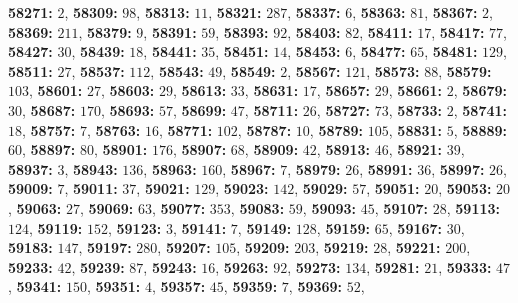 \textsf{\bfseries 58271:} $2$, \textsf{\bfseries 58309:} $98$, \textsf{\bfseries 58313:} $11$, \textsf{\bfseries 58321:} $287$, \textsf{\bfseries 58337:} $6$, \textsf{\bfseries 58363:} $81$, \textsf{\bfseries 58367:} $2$, \textsf{\bfseries 58369:} $211$, \textsf{\bfseries 58379:} $9$, \textsf{\bfseries 58391:} $59$, \textsf{\bfseries 58393:} $92$, \textsf{\bfseries 58403:} $82$, \textsf{\bfseries 58411:} $17$, \textsf{\bfseries 58417:} $77$, \textsf{\bfseries 58427:} $30$, \textsf{\bfseries 58439:} $18$, \textsf{\bfseries 58441:} $35$, \textsf{\bfseries 58451:} $14$, \textsf{\bfseries 58453:} $6$, \textsf{\bfseries 58477:} $65$, \textsf{\bfseries 58481:} $129$, \textsf{\bfseries 58511:} $27$, \textsf{\bfseries 58537:} $112$, \textsf{\bfseries 58543:} $49$, \textsf{\bfseries 58549:} $2$, \textsf{\bfseries 58567:} $121$, \textsf{\bfseries 58573:} $88$, \textsf{\bfseries 58579:} $103$, \textsf{\bfseries 58601:} $27$, \textsf{\bfseries 58603:} $29$, \textsf{\bfseries 58613:} $33$, \textsf{\bfseries 58631:} $17$, \textsf{\bfseries 58657:} $29$, \textsf{\bfseries 58661:} $2$, \textsf{\bfseries 58679:} $30$, \textsf{\bfseries 58687:} $170$, \textsf{\bfseries 58693:} $57$, \textsf{\bfseries 58699:} $47$, \textsf{\bfseries 58711:} $26$, \textsf{\bfseries 58727:} $73$, \textsf{\bfseries 58733:} $2$, \textsf{\bfseries 58741:} $18$, \textsf{\bfseries 58757:} $7$, \textsf{\bfseries 58763:} $16$, \textsf{\bfseries 58771:} $102$, \textsf{\bfseries 58787:} $10$, \textsf{\bfseries 58789:} $105$, \textsf{\bfseries 58831:} $5$, \textsf{\bfseries 58889:} $60$, \textsf{\bfseries 58897:} $80$, \textsf{\bfseries 58901:} $176$, \textsf{\bfseries 58907:} $68$, \textsf{\bfseries 58909:} $42$, \textsf{\bfseries 58913:} $46$, \textsf{\bfseries 58921:} $39$, \textsf{\bfseries 58937:} $3$, \textsf{\bfseries 58943:} $136$, \textsf{\bfseries 58963:} $160$, \textsf{\bfseries 58967:} $7$, \textsf{\bfseries 58979:} $26$, \textsf{\bfseries 58991:} $36$, \textsf{\bfseries 58997:} $26$, \textsf{\bfseries 59009:} $7$, \textsf{\bfseries 59011:} $37$, \textsf{\bfseries 59021:} $129$, \textsf{\bfseries 59023:} $142$, \textsf{\bfseries 59029:} $57$, \textsf{\bfseries 59051:} $20$, \textsf{\bfseries 59053:} $20$, \textsf{\bfseries 59063:} $27$, \textsf{\bfseries 59069:} $63$, \textsf{\bfseries 59077:} $353$, \textsf{\bfseries 59083:} $59$, \textsf{\bfseries 59093:} $45$, \textsf{\bfseries 59107:} $28$, \textsf{\bfseries 59113:} $124$, \textsf{\bfseries 59119:} $152$, \textsf{\bfseries 59123:} $3$, \textsf{\bfseries 59141:} $7$, \textsf{\bfseries 59149:} $128$, \textsf{\bfseries 59159:} $65$, \textsf{\bfseries 59167:} $30$, \textsf{\bfseries 59183:} $147$, \textsf{\bfseries 59197:} $280$, \textsf{\bfseries 59207:} $105$, \textsf{\bfseries 59209:} $203$, \textsf{\bfseries 59219:} $28$, \textsf{\bfseries 59221:} $200$, \textsf{\bfseries 59233:} $42$, \textsf{\bfseries 59239:} $87$, \textsf{\bfseries 59243:} $16$, \textsf{\bfseries 59263:} $92$, \textsf{\bfseries 59273:} $134$, \textsf{\bfseries 59281:} $21$, \textsf{\bfseries 59333:} $47$, \textsf{\bfseries 59341:} $150$, \textsf{\bfseries 59351:} $4$, \textsf{\bfseries 59357:} $45$, \textsf{\bfseries 59359:} $7$, \textsf{\bfseries 59369:} $52$, 

